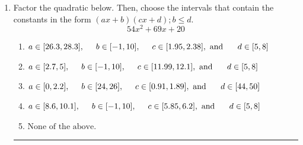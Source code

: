 \documentclass[14pt]{extbook}
\newcommand{\litem}[1]{\item#1\hspace*{-1cm}\rule{\textwidth}{0.4pt}}
\begin{document}
\begin{enumerate}
{\begin{enumerate}[label=\Alph*.]
\end{enumerate} }
\litem{
Factor the quadratic below. Then, choose the intervals that contain the constants in the form $(ax+b)(cx+d); b \leq d.$\[ 54x^{2} +69 x + 20 \]\begin{enumerate}[label=\Alph*.]
\item \( a \in [26.3, 28.3], \hspace*{5mm} b \in [-1, 10], \hspace*{5mm} c \in [1.95, 2.38], \text{ and } \hspace*{5mm} d \in [5, 8] \)
\item \( a \in [2.7, 5], \hspace*{5mm} b \in [-1, 10], \hspace*{5mm} c \in [11.99, 12.1], \text{ and } \hspace*{5mm} d \in [5, 8] \)
\item \( a \in [0, 2.2], \hspace*{5mm} b \in [24, 26], \hspace*{5mm} c \in [0.91, 1.89], \text{ and } \hspace*{5mm} d \in [44, 50] \)
\item \( a \in [8.6, 10.1], \hspace*{5mm} b \in [-1, 10], \hspace*{5mm} c \in [5.85, 6.2], \text{ and } \hspace*{5mm} d \in [5, 8] \)
\item \( \text{None of the above.} \)


\end{enumerate}}
\end{enumerate}
\end{document}
